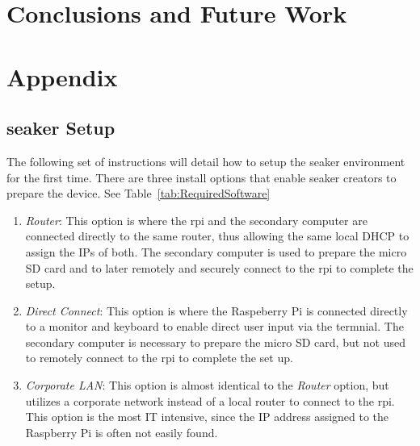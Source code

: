 \documentclass[12pt]{article}
\begin{document}
\section{Conclusions and Future Work}
\label{sect-conclusionAndFutureWork}


\section{Appendix}
\label{sect-Appendix}

\subsection{\gls{seaker} Setup}
The following set of instructions will detail how to setup the \gls{seaker}
environment for the first time. There are three install options that
enable \gls{seaker} creators to prepare the device.  See
Table~\ref{tab:RequiredSoftware}

\begin{enumerate}
  \item {\em Router}: This option is where the \gls{rpi} and the
  secondary computer are connected directly to the same router, thus
  allowing the same local DHCP to assign the IPs of both.  The
  secondary computer is used to prepare the micro SD card and to later
  remotely and securely connect to the \gls{rpi} to complete the
  setup.
  
  \item {\em Direct Connect}: This option is where the Raspeberry Pi
  is connected directly to a monitor and keyboard to enable direct
  user input via the termnial.  The secondary computer is necessary to
  prepare the micro SD card, but not used to remotely connect to the
  \gls{rpi} to complete the set up.

  \item {\em Corporate LAN}: This option is almost identical to the
  {\em Router} option, but utilizes a corporate network instead of
  a local router to connect to the \gls{rpi}.  This option is the
  most IT intensive, since the IP address assigned to the Raspberry
  Pi is often not easily found.
\end{enumerate}
\end{document}
